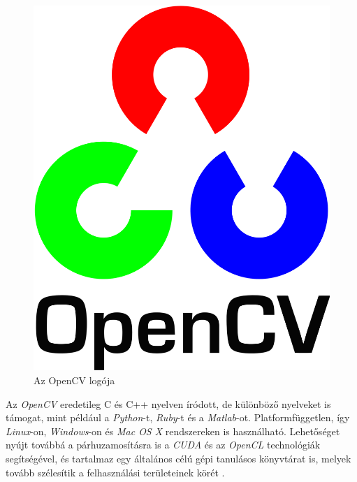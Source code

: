 \begin{figure}[h]
\centering
\includegraphics[width=2.4truecm, height=2.96truecm]{images/OpenCV-logo.png}
\caption{Az OpenCV logója}
\label{fig:opencv}
\end{figure}

Az \textit{OpenCV} eredetileg C és C++ nyelven íródott, de különböző nyelveket is támogat, mint például a \textit{Python}-t, \textit{Ruby}-t és a \textit{Matlab}-ot.
Platformfüggetlen, így \textit{Linux}-on, \textit{Windows}-on és \textit{Mac OS X} rendszereken is használható. Lehetőséget nyújt továbbá a párhuzamosításra is a \textit{CUDA} és az \textit{OpenCL} technológiák segítségével, és tartalmaz egy általános célú gépi tanulásos könyvtárat is, melyek tovább szélesítik a felhasználási területeinek körét \cite{bradski2008learning}.

